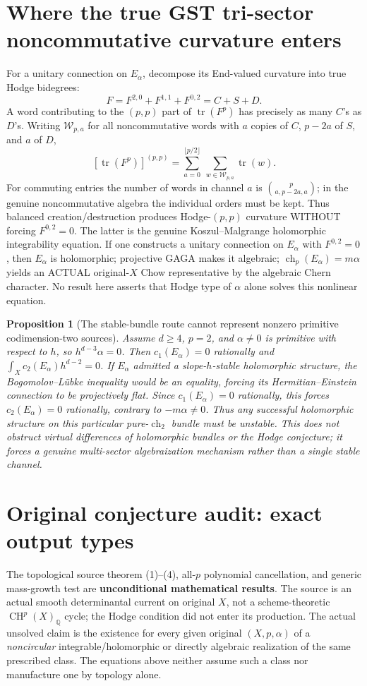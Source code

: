 \documentclass[11pt]{article}
\newtheorem{proposition}[theorem]{Proposition}
\newcommand{\Q}{\mathbb Q}
\newcommand{\CH}{\operatorname{CH}}
\newcommand{\ch}{\operatorname{ch}}
\begin{document}
\section{Where the true GST tri-sector noncommutative curvature enters}
For a unitary connection on \(E_\alpha\), decompose its End-valued curvature into true Hodge bidegrees:
\[
F=F^{2,0}+F^{1,1}+F^{0,2}=C+S+D.
\]
A word contributing to the \((p,p)\) part of \(\operatorname{tr}(F^p)\) has precisely as many \(C\)'s as \(D\)'s. Writing \(\mathcal W_{p,a}\) for all noncommutative words with \(a\) copies of \(C\), \(p-2a\) of \(S\), and \(a\) of \(D\),
\[
\boxed{[\operatorname{tr}(F^p)]^{(p,p)}
=\sum_{a=0}^{\lfloor p/2\rfloor}\ \sum_{w\in\mathcal W_{p,a}}\operatorname{tr}(w).}\tag{7}
\]
For commuting entries the number of words in channel \(a\) is \(\binom p{a,p-2a,a}\); in the genuine noncommutative algebra the individual orders must be kept. Thus balanced creation/destruction produces Hodge-\((p,p)\) curvature WITHOUT forcing \(F^{0,2}=0\). The latter is the genuine Koszul--Malgrange holomorphic integrability equation. If one constructs a unitary connection on \(E_\alpha\) with \(F^{0,2}=0\), then \(E_\alpha\) is holomorphic; projective GAGA makes it algebraic; \(\ch_p(E_\alpha)=m\alpha\) yields an ACTUAL original-\(X\) Chow representative by the algebraic Chern character. No result here asserts that Hodge type of \(\alpha\) alone solves this nonlinear equation.

\begin{proposition}[The stable-bundle route cannot represent nonzero primitive codimension-two sources]
Assume \(d\ge4\), \(p=2\), and \(\alpha\ne0\) is primitive with respect to \(h\), so \(h^{d-3}\alpha=0\). Then \(c_1(E_\alpha)=0\) rationally and \(\int_Xc_2(E_\alpha)h^{d-2}=0\). If \(E_\alpha\) admitted a slope-\(h\)-\emph{stable} holomorphic structure, the Bogomolov--L\"ubke inequality would be an equality, forcing its Hermitian--Einstein connection to be projectively flat. Since \(c_1(E_\alpha)=0\) rationally, this forces \(c_2(E_\alpha)=0\) rationally, contrary to \(-m\alpha\ne0\). Thus any successful holomorphic structure on this \emph{particular} pure-\(\ch_2\) bundle must be unstable. This does not obstruct virtual differences of holomorphic bundles or the Hodge conjecture; it forces a genuine multi-sector algebraization mechanism rather than a single stable channel.
\end{proposition}

\section{Original conjecture audit: exact output types}
The topological source theorem (1)--(4), all-\(p\) polynomial cancellation, and generic mass-growth test are \textbf{unconditional mathematical results}. The source is an actual smooth determinantal current on original \(X\), not a scheme-theoretic \(\CH^p(X)_\Q\) cycle; the Hodge condition did not enter its production. The actual unsolved claim is the existence for every given original \((X,p,\alpha)\) of a \emph{noncircular} integrable/holomorphic or directly algebraic realization of the same prescribed class. The equations above neither assume such a class nor manufacture one by topology alone.
\end{document}
